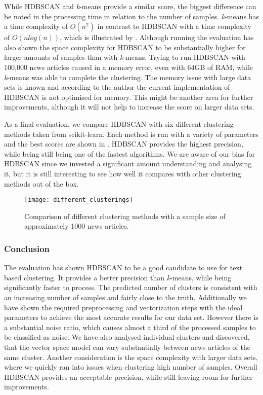 While HDBSCAN and \textit{k}-means provide a similar score,
the biggest difference can be noted in the processing time in relation to the number of samples.
\textit{k}-means has a time complexity of $O(n^2)$ in contrast to HDBSCAN with a time complexity of $O(nlog(n))$,
which is illustrated by .
Although running the evaluation has also shown the space complexity for HDBSCAN
to be substantially higher for larger amounts of samples than with \textit{k}-means.
Trying to run HDBSCAN with 100,000 news articles caused in a memory error,
even with 64GB of RAM, while \textit{k}-means was able to complete the clustering.
The memory issue with large data sets is known and according to the author the current implementation of HDBSCAN
is not optimised for memory\cite{hdbscan_memory_issue}.
This might be another area for further improvements,
although it will not help to increase the score on larger data sets.

As a final evaluation, we compare HDBSCAN with six different clustering methods taken from scikit-learn.
Each method is run with a variety of parameters and the best scores are shown in .
HDBSCAN provides the highest precision, while being still being one of the fastest algorithms.
We are aware of our bias for HDBSCAN since we invested a significant amount understanding and analysing it,
but it is still interesting to see how well it compares with other clustering methods out of the box.

\begin{figure}[h]
    \centering
    \texttt{[image: different\_clusterings]}
    \caption{Comparison of different clustering methods with a sample size of approximately 1000 news articles.}
    \label{fig:different_clusterings}
\end{figure}

\subsubsection{Conclusion}
\label{subsubsec:5a_conclusion}

The evaluation has shown HDBSCAN to be a good candidate to use for text based clustering.
It provides a better precision than \textit{k}-means, while being significantly faster to process.
The predicted number of clusters is consistent with an increasing number of samples and fairly close to the truth.
Additionally we have shown the required preprocessing and vectorization steps with the ideal parameters
to achieve the most accurate results for our data set.
However there is a substantial noise ratio,
which causes almost a third of the processed samples to be classified as noise.
We have also analysed individual clusters and discovered,
that the vector space model can vary substantially between news articles of the same cluster.
Another consideration is the space complexity with larger data sets,
where we quickly ran into issues when clustering high number of samples.
Overall HDBSCAN provides an acceptable precision, while still leaving room for further improvements.

